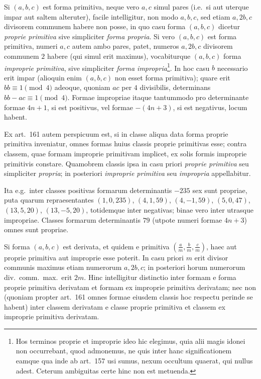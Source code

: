 \documentclass[12pt,a4paper]{article}
\theoremstyle{plain}
\theoremstyle{definition}
\theoremstyle{remark}
\begin{document}
Si $(a,b,c)$ est forma primitiva, neque vero $a,c$ simul pares (i.e.\ si aut uterque impar aut saltem alteruter), facile intelligitur, non modo $a,b,c$, sed etiam $a,2b,c$ divisorem communem habere non posse, in quo casu forma $(a,b,c)$ dicetur \emph{proprie primitiva} sive simpliciter \emph{forma propria}. Si vero $(a,b,c)$ est forma primitiva, numeri $a,c$ autem ambo pares, patet, numeros $a,2b,c$ divisorem communem $2$ habere (qui simul erit maximus), vocabiturque $(a,b,c)$ forma \emph{improprie primitiva}, sive simpliciter \emph{forma impropria}\footnote{Hos terminos proprie et improprie ideo hic elegimus, quia alii magis idonei non occurrebant, quod admonemus, ne quis inter hanc significationem eamque qua inde ab art.~157 usi sumus, nexum occultum quaerat, qui nullus adest. Ceterum ambiguitas certe hinc non est metuenda.}. In hoc casu $b$ necessario erit impar (alioquin enim $(a,b,c)$ non esset forma primitiva); quare erit $bb\equiv1\pmod4$ adeoque, quoniam $ac$ per $4$ divisibilis, determinans $bb-ac\equiv1\pmod4$. Formae impropriae itaque tantummodo pro determinante formae $4n+1$, si est positivus, vel formae $-(4n+3)$, si est negativus, locum habent.

Ex art.~161 autem perspicuum est, si in classe aliqua data forma proprie primitiva inveniatur, omnes formas huius classis proprie primitivas esse; contra classem, quae formam improprie primitivam implicet, ex solis formis improprie primitivis constare. Quamobrem classis ipsa in casu priori \emph{proprie primitiva} seu simpliciter \emph{propria}; in posteriori \emph{improprie primitiva} seu \emph{impropria} appellabitur.

Ita e.g.\ inter classes positivas formarum determinantis $-235$ sex sunt propriae, puta quarum repraesentantes $(1,0,235)$, $(4,1,59)$, $(4,-1,59)$, $(5,0,47)$, $(13,5,20)$, $(13,-5,20)$, totidemque inter negativas; binae vero inter utrasque impropriae. Classes formarum determinantis $79$ (utpote numeri formae $4n+3$) omnes sunt propriae.

Si forma $(a,b,c)$ est derivata, et quidem e primitiva $(\frac{a}{m},\frac{b}{m},\frac{c}{m})$, haec aut proprie primitiva aut improprie esse poterit. In casu priori $m$ erit divisor communis maximus etiam numerorum $a,2b,c$; in posteriori horum numerorum div.\ comm.\ max.\ erit $2m$. Hinc intelligitur distinctio inter formam e forma proprie primitiva derivatam et formam ex improprie primitiva derivatam; nec non (quoniam propter art.~161 omnes formae eiusdem classis hoc respectu perinde se habent) inter classem derivatam e classe proprie primitiva et classem ex improprie primitiva derivatam.
\end{document}
